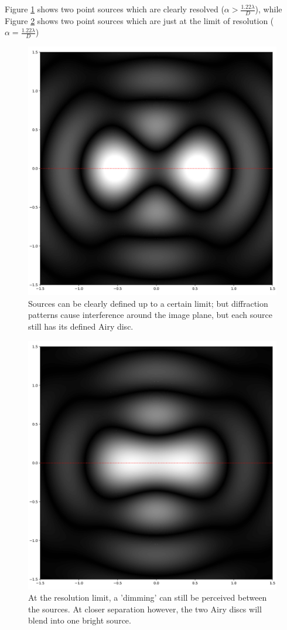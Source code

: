 \documentclass[
]{book}
\begin{document}
Figure \ref{fig:ch13-opticalreslimit2} shows two point sources which are clearly resolved (\(\alpha > \frac{1.22 \lambda}{D}\)), while Figure \ref{fig:ch13-opticalreslimit3} shows two point sources which are just at the limit of resolution (\(\alpha = \frac{1.22 \lambda}{D}\))

\begin{figure}

{\centering \includegraphics[width=0.7\linewidth]{visualisations/ch13-opticalresolutionlimit2} 

}

\caption{Sources can be clearly defined up to a certain limit; but diffraction patterns cause interference around the image plane, but each source still has its defined Airy disc.}\label{fig:ch13-opticalreslimit2}
\end{figure}

\begin{figure}

{\centering \includegraphics[width=0.7\linewidth]{visualisations/ch13-opticalresolutionlimit3} 

}

\caption{At the resolution limit, a 'dimming' can still be perceived between the sources. At closer separation however, the two Airy discs will blend into one bright source.}\label{fig:ch13-opticalreslimit3}
\end{figure}
\end{document}
